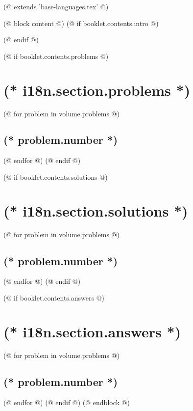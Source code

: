 (@ extends 'base-languages.tex' @)

(@ block content @)
    \setcounter{volume}{(* volume.number *)}%
    \pagestyle{main}
    (@ if booklet.contents.intro @)
        \thispagestyle{first}
        \vspace*{15mm}
        
        \newpage
    (@ endif @)

    (@ if booklet.contents.problems @)
        \section{(* i18n.section.problems *)}
        \pagestyle{problems}    
        (@ for problem in volume.problems @)%
            \setcounter{problem}{(* problem.number *)}%
            \subsection{\texorpdfstring{(* problem.number *)}{(* problem.number *). (* problem.id *)}}%
        (@ endfor @)
        \newpage    
    (@ endif @)

    (@ if booklet.contents.solutions @)
        \section{(* i18n.section.solutions *)}
        \pagestyle{solutions}    
        (@ for problem in volume.problems @)%
            \setcounter{problem}{(* problem.number *)}%
            \subsection{\texorpdfstring{(* problem.number *)}{(* problem.number *). (* problem.id *)}}%
        (@ endfor @)
        \newpage
    (@ endif @)

    (@ if booklet.contents.answers @)
        \section{(* i18n.section.answers *)}
        \pagestyle{answers}
        (@ for problem in volume.problems @)%
            \setcounter{problem}{(* problem.number *)}%
            \subsection{\texorpdfstring{(* problem.number *)}{(* problem.number *). (* problem.id *)}}%
        (@ endfor @)
    (@ endif @)
(@ endblock @)
